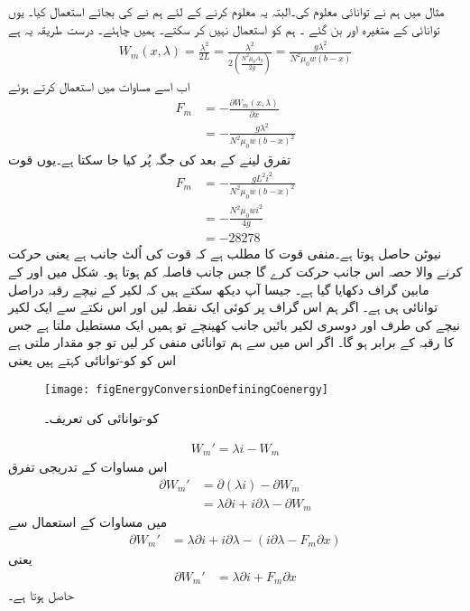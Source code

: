 مثال  میں ہم نے توانائی معلوم کی۔البتہ یہ معلوم کرنے  کے لئے ہم نے  کی  بجائے  استعمال کیا۔ یوں  توانائی کے متغیرہ   اور  بن گئے ۔  ہم  کو استعمال نہیں کر سکتے۔ ہمیں  چاہئے۔ درست طریقہ یہ ہے
\begin{align*}
W_m(x,\lambda)=\frac{\lambda^2}{2 L}=\frac{\lambda^2}{2 \left(\frac{N^2 \mu_0 A_g}{2 g} \right)}=\frac{ g \lambda^2}{N^2 \mu_0 w (b-x)}
\end{align*}
اب اسے مساوات  میں استعمال کرتے ہوئے
\begin{align*}
F_m&=-\frac{\partial W_m(x,\lambda)}{\partial x}\\
&=-\frac{g \lambda^2}{N^2 \mu_0 w (b-x)^2}
\end{align*}
تفرق لینے کے بعد  کی جگہ  پُر کیا جا سکتا ہے۔یوں قوت
\begin{align*}
F_m&=-\frac{g L^2 i^2}{N^2 \mu_0 w (b-x)^2}\\
&=-\frac{N^2 \mu_0 w i^2}{4 g}\\
&=\num{-28278}
\end{align*}
نیوٹن حاصل ہوتا ہے۔منفی قوت کا مطلب ہے کہ قوت  کی اُلٹ جانب ہے یعنی حرکت کرنے والا حصہ اس جانب حرکت کرے گا جس جانب فاصلہ کم ہوتا ہو۔
%
	شکل   میں  اور  کے مابین گراف دکھایا گیا ہے۔ جیسا آپ دیکھ سکتے ہیں کہ لکیر کے نیچے رقبہ دراصل توانائی ہی ہے۔ اگر ہم اس گراف پر کوئی ایک نقطہ  لیں اور اس نکتے سے ایک لکیر نیچے کی طرف اور دوسری لکیر بائیں جانب کھینچے تو ہمیں ایک مستطیل ملتا ہے جس کا رقبہ  کے برابر ہو گا۔ اگر اس میں سے ہم توانائی   منفی کر لیں تو جو مقدار ملتی ہے اس کو کو-توانائی  کہتے ہیں یعنی
\begin{figure}
\centering
\texttt{[image: figEnergyConversionDefiningCoenergy]}
\caption{کو-توانائی کی تعریف۔}
\label{شکل_تبادلہ_توانائی_کو_توانائی_کی_تعریف}
\end{figure}

\begin{align}
W_m'=\lambda i -W_m
\end{align}
اس مساوات کے تدریجی تفرق
\begin{align*}
\partial W_m'&=\partial (\lambda i) -\partial W_m\\
&=\lambda \partial i + i \partial \lambda -\partial W_m
\end{align*}
میں مساوات   کے استعمال سے
\begin{align*}
\partial W_m'&=\lambda \partial i + i \partial \lambda -(i \partial \lambda-F_m \partial x)
\end{align*}
یعنی
\begin{align}\label{مساوات_تبادلہ_کو_توانائی_تعریفی_مساوات}
\partial W_m'&=\lambda \partial i + F_m \partial x
\end{align}
حاصل ہوتا ہے۔

